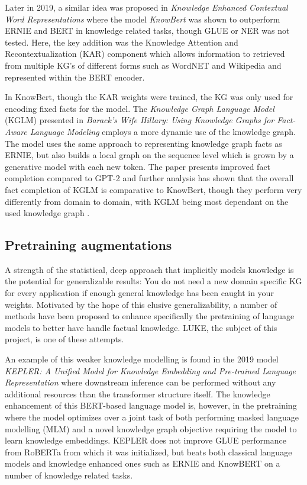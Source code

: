 \documentclass[main.tex]{subfiles}
\begin{document}
Later in 2019, a similar idea was proposed in \emph{Knowledge Enhanced Contextual Word Representations} where the model \emph{KnowBert} \cite{peters2019knowbert} was shown to outperform ERNIE and BERT in knowledge related tasks, though GLUE or NER was not tested.
Here, the key addition was the Knowledge Attention and Recontextualization (KAR) component which allows information to retrieved from multiple KG's of different forms such as WordNET and Wikipedia and represented within the BERT encoder.

In KnowBert, though the KAR weights were trained, the KG was only used for encoding fixed facts for the model.
The \emph{Knowledge Graph Language Model} (KGLM) presented in \emph{Barack’s Wife Hillary: Using Knowledge Graphs for Fact-Aware Language Modeling} \cite{logan2019barack} employs a more dynamic use of the knowledge graph.
The model uses the same approach to representing knowledge graph facts as ERNIE, but also builds a local graph on the sequence level which is grown by a generative model with each new token.
The paper presents improved fact completion compared to GPT-2 and further analysis has shown that the overall fact completion of KGLM is comparative to KnowBert, though they perform very differently from domain to domain, with KGLM being most dependant on the used knowledge graph \cite{birk2020knowledge}.

\subsection{Pretraining augmentations}
A strength of the statistical, deep approach that implicitly models knowledge is the potential for generalizable results:
You do not need a new domain specific KG for every application if enough general knowledge has been caught in your weights.
Motivated by the hope of this elusive generalizability, a number of methods have been proposed to enhance specifically the pretraining of language models to better have handle factual knowledge.
LUKE, the subject of this project, is one of these attempts.

An example of this weaker knowledge modelling is found in the 2019 model \emph{KEPLER: A Unified Model for Knowledge Embedding and Pre-trained Language Representation} \cite{wang2021kepler} where downstream inference can be performed without any additional resources than the transformer structure itself.
The knowledge enhancement of this BERT-based language model is, however, in the pretraining where the model optimizes over a joint task of both performing masked language modelling (MLM) and a novel knowledge graph objective requiring the model to learn knowledge embeddings.
KEPLER does not improve GLUE performance from RoBERTa \cite{liu2019roberta} from which it was initialized, but beats both classical language models and knowledge enhanced ones such as ERNIE and KnowBERT on a number of knowledge related tasks.
\end{document}
